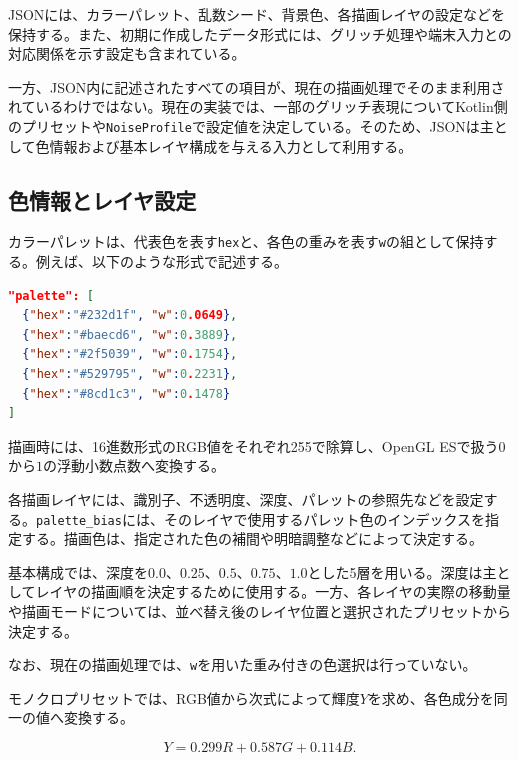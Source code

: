 JSONには、カラーパレット、乱数シード、背景色、各描画レイヤの設定などを保持する。また、初期に作成したデータ形式には、グリッチ処理や端末入力との対応関係を示す設定も含まれている。

一方、JSON内に記述されたすべての項目が、現在の描画処理でそのまま利用されているわけではない。現在の実装では、一部のグリッチ表現についてKotlin側のプリセットや\texttt{NoiseProfile}で設定値を決定している。そのため、JSONは主として色情報および基本レイヤ構成を与える入力として利用する。


\subsection{色情報とレイヤ設定}

カラーパレットは、代表色を表す\texttt{hex}と、各色の重みを表す\texttt{w}の組として保持する。例えば、以下のような形式で記述する。

\noindent\begin{minipage}{\linewidth}
\begin{lstlisting}[language=JSON,caption={描画に用いるカラーパレットの例},label={lst:render-palette}]
"palette": [
  {"hex":"#232d1f", "w":0.0649},
  {"hex":"#baecd6", "w":0.3889},
  {"hex":"#2f5039", "w":0.1754},
  {"hex":"#529795", "w":0.2231},
  {"hex":"#8cd1c3", "w":0.1478}
]
\end{lstlisting}
\end{minipage}\par

描画時には、16進数形式のRGB値をそれぞれ255で除算し、OpenGL ESで扱う$0$から$1$の浮動小数点数へ変換する。

各描画レイヤには、識別子、不透明度、深度、パレットの参照先などを設定する。\texttt{palette\_bias}には、そのレイヤで使用するパレット色のインデックスを指定する。描画色は、指定された色の補間や明暗調整などによって決定する。

基本構成では、深度を$0.0$、$0.25$、$0.5$、$0.75$、$1.0$とした5層を用いる。深度は主としてレイヤの描画順を決定するために使用する。一方、各レイヤの実際の移動量や描画モードについては、並べ替え後のレイヤ位置と選択されたプリセットから決定する。

なお、現在の描画処理では、\texttt{w}を用いた重み付きの色選択は行っていない。

モノクロプリセットでは、RGB値から次式によって輝度$Y$を求め、各色成分を同一の値へ変換する。

\begin{equation}
Y=0.299R+0.587G+0.114B.
\end{equation}

